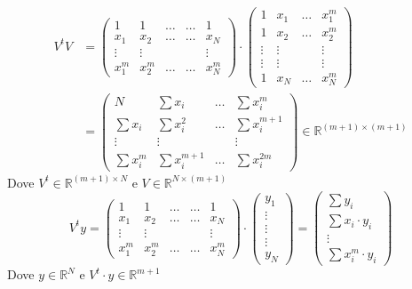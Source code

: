 \documentclass[12pt,a4paper]{article}
\begin{document}
\[\begin{split}
    V^tV & = \begin{pmatrix}
        1 & 1 & \dotso & \dotso & 1 \\
        x_1 & x_2 & \dotso & \dotso & x_N \\
        \vdots & \vdots & & & \vdots \\
        x_1^m & x_2^m & \dotso & \dotso & x_N^m
    \end{pmatrix} \cdot
    \begin{pmatrix}
        1 & x_1 & \dotso & x_1^m \\
        1 & x_2 & \dotso & x_2^m \\
        \vdots & \vdots & & \vdots \\
        \vdots & \vdots & & \vdots \\
        1 & x_N & \dotso & x_N^m
    \end{pmatrix} \\
    & = \begin{pmatrix}
        N & \sum x_i & \dotso & \sum x_i^m \\
        \sum x_i & \sum x_i^2 & \dotso & \sum x_i^{m+1} \\
        \vdots & \vdots & & \vdots \\
        \sum x_i^m & \sum x_i^{m+1} & \dotso & \sum x_i^{2m}
    \end{pmatrix} \in \mathbb{R}^{(m+1)\times(m+1)}
\end{split}\]
Dove $V^t \in \mathbb{R}^{(m+1)\times N}$ e $V \in \mathbb{R}^{N\times (m+1)}$
\[
V^t y =
\begin{pmatrix}
1 & 1 & \dotso & \dotso & 1 \\
x_1 & x_2 & \dotso & \dotso & x_N \\
\vdots & \vdots & & & \vdots \\
x_1^m & x_2^m & \dotso & \dotso & x_N^m
\end{pmatrix}
\cdot
\begin{pmatrix}
y_1 \\ \vdots \\ \vdots \\ \vdots \\ y_N
\end{pmatrix}
=
\begin{pmatrix}
\sum y_i \\
\sum x_i \cdot y_i \\ \vdots \\ \sum x_i^m \cdot y_i
\end{pmatrix}
\]
Dove $y \in \mathbb{R}^N$ e $V^t \cdot y \in \mathbb{R}^{m+1}$\\
\end{document}
